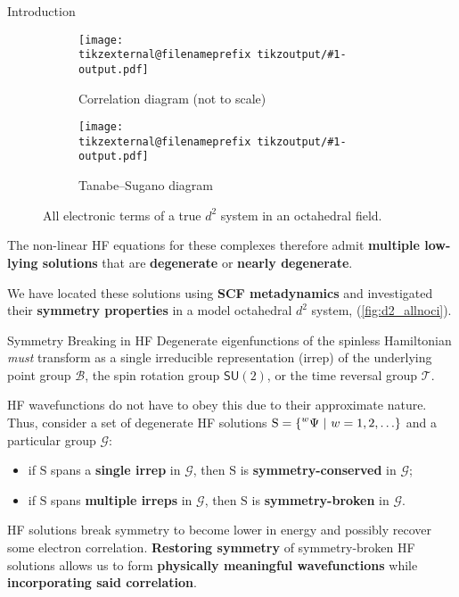\documentclass[final, xcolor={svgnames}]{beamer}
\makeatletter
\newif\iftikzex
\newcommand*{\useexternalfile}[1]{%
		\iftikzex
			\tikzsetnextfilename{tikzoutput/#1-output}%
			\scalebox{1}{}
		\else
			\texttt{[image: \\tikzexternal@filenameprefix tikzoutput/\#1-output.pdf]}
		\fi
	}
\newlength{\colwidth}
\makeatother
\begin{document}
\begin{frame}[t]
\begin{columns}[t]
\begin{column}{\colwidth}
\begin{block}{Introduction}
				\begin{figure}
					\begin{subfigure}[b]{0.49\textwidth}
						\centering
						\useexternalfile{corrd2}
						\caption{Correlation diagram (not to scale)}
					\end{subfigure}
					\hfill
					\begin{subfigure}[b]{0.49\textwidth}
						\centering
						\useexternalfile{TSd2}
						\caption{Tanabe--Sugano diagram}
					\end{subfigure}
					\caption{All electronic terms of a true $d^2$ system in an octahedral field.}
					\label{fig:corrTSd2}
				\end{figure}
				
			The non-linear HF equations for these complexes therefore admit \textbf{\color{Blue} multiple low-lying solutions} that are \textbf{\color{Blue} degenerate} or \textbf{\color{Blue} nearly degenerate}.
			
			We have located these solutions using \textbf{\color{Blue} SCF metadynamics} and investigated their \textbf{\color{red} symmetry properties} in a model octahedral $d^2$ system,  (\cref{fig:d2_allnoci}).
	  	\end{block}
	
		\begin{alertblock}{Symmetry Breaking in HF}
			Degenerate eigenfunctions of the spinless Hamiltonian \emph{must} transform as a single irreducible representation (irrep) of the underlying point group $\mathcal{B}$, the spin rotation group $\mathsf{SU}(2)$, or the time reversal group $\mathcal{T}$.

			HF wavefunctions do not have to obey this due to their approximate nature. Thus, consider a set of degenerate HF solutions %
				$\mathrm{S} =
					\left\lbrace
						\prescript{w}{}{\Psi} %
						\ | \ %
						w = 1, 2, \ldots %
					\right\rbrace%
				$ %
			and a particular group $\mathcal{G}$:
				\begin{itemize}
					\item if $\mathrm{S}$ spans a \textbf{\color{Blue} single irrep} in $\mathcal{G}$, then $\mathrm{S}$ is \textbf{\color{red} symmetry-conserved} in $\mathcal{G}$;
					\item if $\mathrm{S}$ spans \textbf{\color{Blue} multiple
					irreps} in $\mathcal{G}$, then $\mathrm{S}$ is \textbf{\color{red} symmetry-broken} in $\mathcal{G}$.
				\end{itemize}

			HF solutions break symmetry to become lower in energy and possibly recover some electron correlation. \textbf{\color{Blue} Restoring symmetry} of symmetry-broken HF solutions allows us to form \textbf{\color{red} physically meaningful wavefunctions} while \textbf{\color{red} incorporating said correlation}.
		\end{alertblock}
	

\end{column}
\end{columns}
\end{frame}
\end{document}
